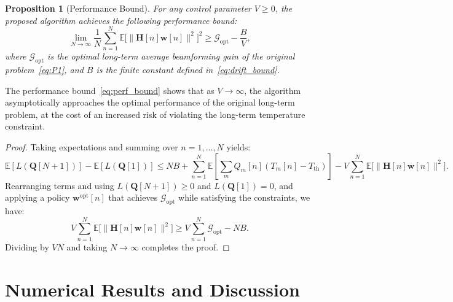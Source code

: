 \documentclass[journal]{IEEEtran}
\newtheorem{proposition}{Proposition}
\begin{document}
\begin{proposition}[Performance Bound]
\label{prop:perf}
For any control parameter $V \geq 0$, the proposed algorithm achieves the following performance bound:
\begin{equation}
    \lim_{N\to\infty}\frac{1}{N}\sum_{n=1}^{N}\mathbb{E}\bigl[\|\mathbf{H}[n]\mathbf{w}[n]\|^2\bigr]^2 \geq \mathcal{G}_{\mathrm{opt}} - \frac{B}{V},
    \label{eq:perf_bound}
\end{equation}
where $\mathcal{G}_{\mathrm{opt}}$ is the optimal long-term average beamforming gain of the original problem~\eqref{eq:P1}, and $B$ is the finite constant defined in~\eqref{eq:drift_bound}.
\end{proposition}

The performance bound~\eqref{eq:perf_bound} shows that as $V \to \infty$, the algorithm asymptotically approaches the optimal performance of the original long-term problem, at the cost of an increased risk of violating the long-term temperature constraint.

\begin{proof}
Taking expectations and summing over $n = 1, \ldots, N$ yields:
\begin{equation}
    \mathbb{E}[L(\mathbf{Q}[N+1])] - \mathbb{E}[L(\mathbf{Q}[1])] \leq NB
    + \sum_{n=1}^{N}\mathbb{E}\left[\sum_m Q_m[n](T_m[n] - T_{\text{th}})\right]
    - V\sum_{n=1}^{N}\mathbb{E}\bigl[\|\mathbf{H}[n]\mathbf{w}[n]\|^2\bigr].
\end{equation}
Rearranging terms and using $L(\mathbf{Q}[N+1]) \geq 0$ and $L(\mathbf{Q}[1]) = 0$, and applying a policy $\mathbf{w}^{\mathrm{opt}}[n]$ that achieves $\mathcal{G}_{\mathrm{opt}}$ while satisfying the constraints, we have:
\begin{equation}
    V\sum_{n=1}^{N}\mathbb{E}\bigl[\|\mathbf{H}[n]\mathbf{w}[n]\|^2\bigr] \geq
    V\sum_{n=1}^{N}\mathcal{G}_{\mathrm{opt}} - NB.
\end{equation}
Dividing by $VN$ and taking $N \to \infty$ completes the proof.
\end{proof}


\section{Numerical Results and Discussion}
\label{sec:results}
\end{document}
